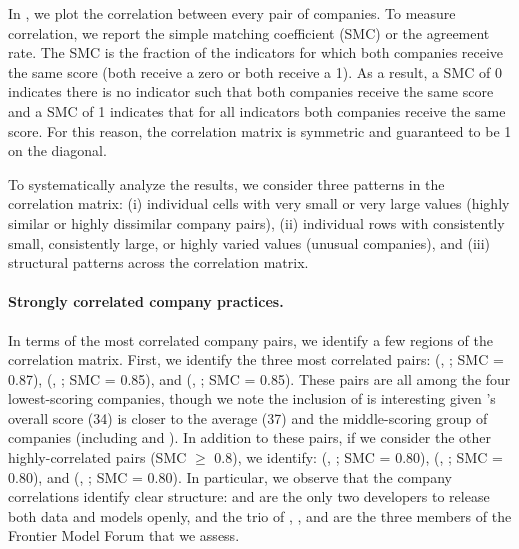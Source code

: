 \documentclass[screen, authorversion, acmsmall]{acmart}
\begin{document}
In , we plot the correlation between every pair of companies.
To measure correlation, we report the simple matching coefficient (SMC) or the agreement rate.
The SMC is the fraction of the \numindicators indicators for which both companies receive the same score (\ie both receive a zero or both receive a 1). 
As a result, a SMC of 0 indicates there is no indicator such that both companies receive the same score and a SMC of 1 indicates that for all indicators both companies receive the same score. 
For this reason, the correlation matrix is symmetric and guaranteed to be 1 on the diagonal. 

To systematically analyze the results, we consider three patterns in the correlation matrix:
(i) individual cells with very small or very large values (\ie highly similar or highly dissimilar company pairs),
(ii) individual rows with consistently small, consistently large, or highly varied values (\ie unusual companies),
and
(iii) structural patterns across the correlation matrix.

\paragraph{Strongly correlated company practices.}
In terms of the most correlated company pairs, we identify a few regions of the correlation matrix.
First, we identify the three most correlated pairs: 
(\cohere, \aitwentyone; SMC = 0.87),
(\aitwentyone, \amazon; SMC = 0.85),
and
(\inflection, \amazon; SMC = 0.85).
These pairs are all among the four lowest-scoring companies, though we note the inclusion of \cohere is interesting given \cohere's overall score (34) is closer to the average (37) and the middle-scoring group of companies (\ie including \google and \anthropic).
In addition to these pairs, if we consider the other highly-correlated pairs (SMC $\geq$ 0.8), we identify:
(\huggingface, \stability; SMC = 0.80),
(\openai, \anthropic; SMC = 0.80),
and
(\google, \anthropic; SMC = 0.80).
In particular, we observe that the company correlations identify clear structure: \huggingface and \stability are the only two developers to release both data and models openly, and the trio of \openai, \google, and \anthropic are the three members of the Frontier Model Forum that we assess.
\end{document}
